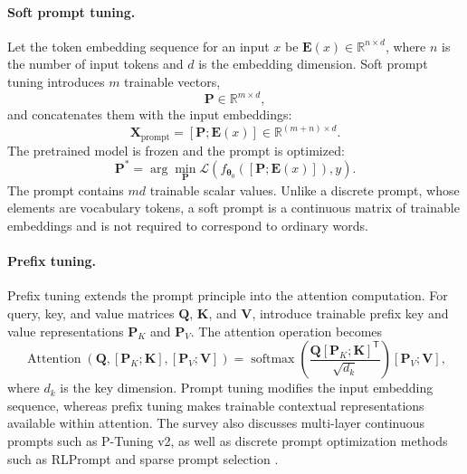 \paragraph{Soft prompt tuning.}
Let the token embedding sequence for an input $x$ be
$\mathbf{E}(x)\in\mathbb{R}^{n\times d}$, where $n$ is the number of input
tokens and $d$ is the embedding dimension. Soft prompt tuning introduces
$m$ trainable vectors,
\begin{equation}
    \mathbf{P}\in\mathbb{R}^{m\times d},
    \label{eq:peft-soft-prompt}
\end{equation}
and concatenates them with the input embeddings:
\begin{equation}
    \mathbf{X}_{\mathrm{prompt}}
    =
    [\mathbf{P};\mathbf{E}(x)]
    \in\mathbb{R}^{(m+n)\times d}.
    \label{eq:peft-prompt-concat}
\end{equation}
The pretrained model is frozen and the prompt is optimized:
\begin{equation}
    \mathbf{P}^{*}
    =
    \arg\min_{\mathbf{P}}
    \mathcal{L}
    \left(
        f_{\boldsymbol{\theta}_0}
        ([\mathbf{P};\mathbf{E}(x)]),y
    \right).
    \label{eq:peft-prompt-objective}
\end{equation}
The prompt contains $md$ trainable scalar values. Unlike a discrete prompt,
whose elements are vocabulary tokens, a soft prompt is a continuous matrix
of trainable embeddings and is not required to correspond to ordinary words.

\paragraph{Prefix tuning.}
Prefix tuning extends the prompt principle into the attention computation.
For query, key, and value matrices $\mathbf{Q}$, $\mathbf{K}$, and
$\mathbf{V}$, introduce trainable prefix key and value representations
$\mathbf{P}_K$ and $\mathbf{P}_V$. The attention operation becomes
\begin{equation}
    \operatorname{Attention}
    \left(
        \mathbf{Q},
        [\mathbf{P}_K;\mathbf{K}],
        [\mathbf{P}_V;\mathbf{V}]
    \right)
    =
    \operatorname{softmax}
    \left(
        \frac{
            \mathbf{Q}[\mathbf{P}_K;\mathbf{K}]^{\mathsf T}
        }{\sqrt{d_k}}
    \right)
    [\mathbf{P}_V;\mathbf{V}],
    \label{eq:peft-prefix-attention}
\end{equation}
where $d_k$ is the key dimension. Prompt tuning modifies the input
embedding sequence, whereas prefix tuning makes trainable contextual
representations available within attention. The survey also discusses
multi-layer continuous prompts such as P-Tuning v2, as well as discrete
prompt optimization methods such as RLPrompt and sparse prompt selection
\parencite{prottasha2025peft}.

